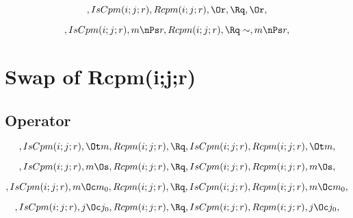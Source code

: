 \[, IsCpm(i;j;r), Rcpm(i;j;r), \Or, \Rq , \Or, \]


\[, IsCpm(i;j;r), m \nPs r, Rcpm(i;j;r), \Rq \sim, m \nPs r, \]


\bigskip
\bigskip
\section{Swap of Rcpm(i;j;r)}
\subsection{Operator}
\[, IsCpm(i;j;r), \Ot m, Rcpm(i;j;r), \Rq , IsCpm(i;j;r), Rcpm(i;j;r), \Ot m,\]

\[, IsCpm(i;j;r), m \Os, Rcpm(i;j;r), \Rq , IsCpm(i;j;r), Rcpm(i;j;r), m \Os,\]

\[, IsCpm(i;j;r), m \Oc m_0, Rcpm(i;j;r), \Rq , IsCpm(i;j;r), Rcpm(i;j;r), m \Oc m_0,\]

\[, IsCpm(i;j;r), j \Oc j_0, Rcpm(i;j;r), \Rq , IsCpm(i;j;r), Rcpm(i;j;r), j \Oc j_0,\]


